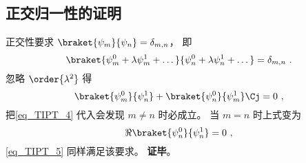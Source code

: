 \subsection{正交归一性的证明}
正交性要求 $\braket{\psi_m}{\psi_n} = \delta_{m,n}$， 即
\begin{equation}\label{eq_TIPT_7}
\braket{\psi_m^0 + \lambda \psi_m^1 + \dots}{\psi_n^0 + \lambda \psi_n^1 + \dots} = \delta_{m,n}~.
\end{equation}
忽略 $\order{\lambda^2}$ 得
\begin{equation}\label{eq_TIPT_8}
\braket{\psi_m^0}{\psi_n^1} + \braket{\psi_n^0}{\psi_m^1}\Cj = 0~,
\end{equation}
把\autoref{eq_TIPT_4} 代入会发现 $m \ne n$ 时必成立。 当 $m = n$ 时上式变为
\begin{equation}
\Re{\braket{\psi_n^0}{\psi_n^1}} = 0~,
\end{equation}
\autoref{eq_TIPT_5} 同样满足该要求。 \textbf{证毕}。
